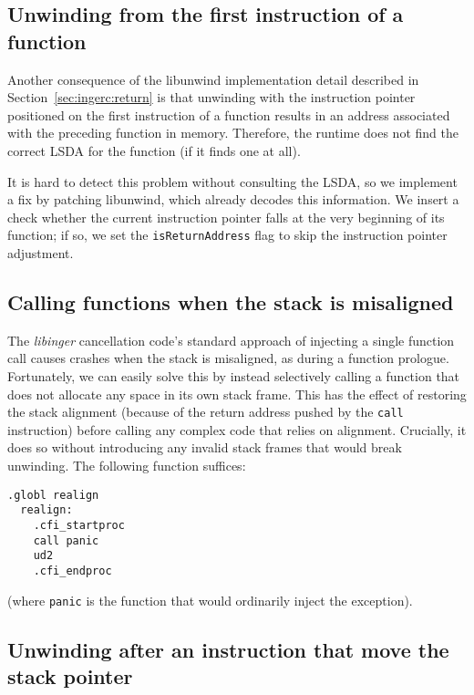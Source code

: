 \subsection{Unwinding from the first instruction of a function}
\label{sec:ingerc:start}

Another consequence of the libunwind implementation detail described in
Section~\ref{sec:ingerc:return} is that unwinding with the instruction pointer
positioned on the first instruction of a function results in an address associated
with the preceding function in memory.  Therefore, the runtime does not find the
correct LSDA for the function (if it finds one at all).

It is hard to detect this problem without consulting the LSDA, so we implement a fix
by patching libunwind, which already decodes this information.  We insert a check
whether the current instruction pointer falls at the very beginning of its function;
if so, we set the \texttt{isReturnAddress} flag to skip the instruction pointer
adjustment.


\subsection{Calling functions when the stack is misaligned}
\label{sec:ingerc:realign}

The \textit{libinger} cancellation code's standard approach of injecting a single
function call causes crashes when the stack is misaligned, as during a function
prologue.  Fortunately, we can easily solve this by instead selectively calling a
function that does not allocate any space in its own stack frame.  This has the
effect of restoring the stack alignment (because of the return address pushed by the
\texttt{call} instruction) before calling any complex code that relies on alignment.
Crucially, it does so without introducing any invalid stack frames that would break
unwinding.  The following function suffices:
\begin{lstlisting}[language={[x86masm]Assembler},morekeywords=ud2]
  	.globl realign
  realign:
  	.cfi_startproc
  	call panic
  	ud2
  	.cfi_endproc
\end{lstlisting}

\noindent
(where \texttt{panic} is the function that would ordinarily inject the exception).


\subsection{Unwinding after an instruction that move the stack pointer}

